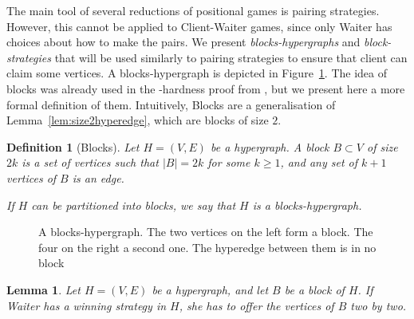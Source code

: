 \documentclass{article}
\def\rotateclockwise#1{
\newdimen\xrw
  \pgfextractx{\xrw}{#1}
  \newdimen\yrw
  \pgfextracty{\yrw}{#1}
\pgfpoint{\yrw}{-\xrw}
}
\def\rotatecounterclockwise#1{
\newdimen\xrcw
  \pgfextractx{\xrcw}{#1}
  \newdimen\yrcw
  \pgfextracty{\yrcw}{#1}
\pgfpoint{-\yrcw}{\xrcw}
}
\def\outsidespacerpgfclockwise#1#2#3{
\pgfpointscale{#3}{
    \rotateclockwise{
      \pgfpointnormalised{
        \pgfpointdiff{#1}{#2}}}}
}
\def\outsidespacerpgfcounterclockwise#1#2#3{
\pgfpointscale{#3}{
    \rotatecounterclockwise{
      \pgfpointnormalised{
        \pgfpointdiff{#1}{#2}}}}
}
\def\outsidepgfclockwise#1#2#3{
\pgfpointadd{#2}{\outsidespacerpgfclockwise{#1}{#2}{#3}}
}
\def\outsidepgfcounterclockwise#1#2#3{
\pgfpointadd{#2}{\outsidespacerpgfcounterclockwise{#1}{#2}{#3}}
}
\def\outside#1#2#3{
  ($ (#2) ! #3 ! -90 : (#1) $)
}
\def\cornerpgf#1#2#3#4{
\pgfextra{
    \pgfmathanglebetweenpoints{#2}{\outsidepgfcounterclockwise{#1}{#2}{#4}}
    \let\anglea\pgfmathresult
    \let\startangle\pgfmathresult

    \pgfmathanglebetweenpoints{#2}{\outsidepgfclockwise{#3}{#2}{#4}}
    \pgfmathparse{\pgfmathresult - \anglea}
    \pgfmathroundto{\pgfmathresult}
    \let\arcangle\pgfmathresult
    \ifthenelse{180=\arcangle \or 180<\arcangle}{
      \pgfmathparse{-360 + \arcangle}}{
      \pgfmathparse{\arcangle}}
    \let\deltaangle\pgfmathresult

    \newdimen\x
    \pgfextractx{\x}{\outsidepgfcounterclockwise{#1}{#2}{#4}}
    \newdimen\y
    \pgfextracty{\y}{\outsidepgfcounterclockwise{#1}{#2}{#4}}
  }
  -- (\x,\y) arc [start angle=\startangle, delta angle=\deltaangle, radius=#4]
}
\def\corner#1#2#3#4{
  \cornerpgf{\pgfpointanchor{#1}{center}}{\pgfpointanchor{#2}{center}}{\pgfpointanchor{#3}{center}}{#4}
}
\def\hedgeiii#1#2#3#4{
\outside{#1}{#2}{#4} \corner{#1}{#2}{#3}{#4} \corner{#2}{#3}{#1}{#4} \corner{#3}{#1}{#2}{#4} -- cycle
}
\def\hedgem#1#2#3#4{


  \outside{#1}{#2}{#4}
  \pgfextra{
    \def\hgnodea{#1}
    \def\hgnodeb{#2}
  }
  foreach \c in {#3} {
    \corner{\hgnodea}{\hgnodeb}{\c}{#4}
    \pgfextra{
      \global\let\hgnodea\hgnodeb
      \global\let\hgnodeb\c
    }
  }
  \corner{\hgnodea}{\hgnodeb}{#1}{#4}
  \corner{\hgnodeb}{#1}{#2}{#4}
  -- cycle
}
\def\hedgeii#1#2#3{
\hedgem{#1}{#2}{}{#3}
}
\newcommand{\hyp}{H}
\newcommand{\WS}{E}
\newcommand{\som}{V}
\newcommand{\hxf}{\hyp = (\som, \WS)}
\newcommand{\hedge}{edge\xspace}
\newtheorem{lemma}[theorem]{Lemma}
\newtheorem{definition}[theorem]{Definition}
\begin{document}
The main tool of several reductions of positional games is pairing strategies. However, this cannot be applied to Client-Waiter games, since only Waiter has choices about how to make the pairs. We present {\em blocks-hypergraphs} and {\em block-strategies} that will be used similarly to pairing strategies to ensure that client can claim some vertices. A blocks-hypergraph is depicted in Figure~\ref{fig:block}. The idea of blocks was already used in the \NP-hardness proof from \cite{CMP11}, but we present here a more formal definition of them. Intuitively, Blocks are a generalisation of Lemma~\ref{lem:size2hyperedge}, which are blocks of size $2$.



\begin{definition}[Blocks] \label{definition: blocks in Client-Waiter}
Let $\hxf$ be a hypergraph. A {\em block} $B \subset \som$ of size $2k$ is a set of vertices such that $|B| = 2k$ for some $k \ge 1$, and any set of $k+1$ vertices of $B$ is an \hedge.

If $\hyp$ can be partitioned into blocks, we say that $\hyp$ is a {\em blocks-hypergraph}.
\end{definition} 

\begin{figure}[ht]
    \centering


    
    \caption{A blocks-hypergraph. The two vertices on the left form a block. The four on the right a second one. The hyperedge between them is in no block}
    \label{fig:block}
\end{figure} 
\begin{lemma}
    Let $\hxf$ be a hypergraph, and let $B$ be a block of $\hyp$. If Waiter has a winning strategy in $\hyp$, she has to offer the vertices of $B$ two by two.
\end{lemma}
\end{document}
